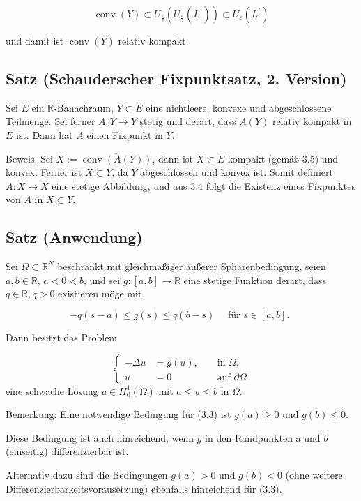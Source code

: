 \documentclass[10pt, letterpaper]{article}
\begin{document}
$$
\operatorname{conv}(Y) \subset U_{\frac{\varepsilon}{2}}\left(U_{\frac{\varepsilon}{2}}\left(L^{\prime}\right)\right) \subset U_{\varepsilon}\left(L^{\prime}\right)
$$

und damit ist $\operatorname{conv}(Y)$ relativ kompakt.

\subsection*{Satz (Schauderscher Fixpunktsatz, 2. Version)}

Sei $E$ ein $\mathbb{R}$-Banachraum, $Y \subset E$ eine nichtleere, konvexe und abgeschlossene Teilmenge. Sei ferner $A: Y \rightarrow Y$ stetig und derart, dass $A(Y)$ relativ kompakt in $E$ ist. Dann hat $A$ einen Fixpunkt in $Y$.

Beweis. Sei $X:=\overline{\operatorname{conv}(A(Y))}$, dann ist $X \subset E$ kompakt (gemäß 3.5) und konvex. Ferner ist $X \subset Y$, da $Y$ abgeschlossen und konvex ist. Somit definiert $A: X \rightarrow X$ eine stetige Abbildung, und aus 3.4 folgt die Existenz eines Fixpunktes von $A$ in $X \subset Y$.

\subsection*{Satz (Anwendung)}

Sei $\Omega \subset \mathbb{R}^{N}$ beschränkt mit gleichmäßiger äußerer Sphärenbedingung, seien $a, b \in \mathbb{R}$, $a<0<b$, und sei $g:[a, b] \rightarrow \mathbb{R}$ eine stetige Funktion derart, dass $q \in \mathbb{R}, q>0$ existieren möge mit

$$
-q(s-a) \leq g(s) \leq q(b-s) \quad \text { für } s \in[a, b] \text {. }
$$

Dann besitzt das Problem

$$
\left\{\begin{aligned}
-\Delta u & =g(u), & & \text { in } \Omega, \\
u & =0 & & \text { auf } \partial \Omega
\end{aligned}\right.
$$
eine schwache Lösung $u \in H_{0}^{1}(\Omega)$ mit $a \leq u \leq b$ in $\Omega$.

Bemerkung: Eine notwendige Bedingung für (3.3) ist $g(a) \geq 0$ und $g(b) \leq 0$.

Diese Bedingung ist auch hinreichend, wenn $g$ in den Randpunkten a und $b$ (einseitig) differenzierbar ist.

Alternativ dazu sind die Bedingungen $g(a)>0$ und $g(b)<0$ (ohne weitere Differenzierbarkeitsvorausetzung) ebenfalls hinreichend für (3.3).
\end{document}
